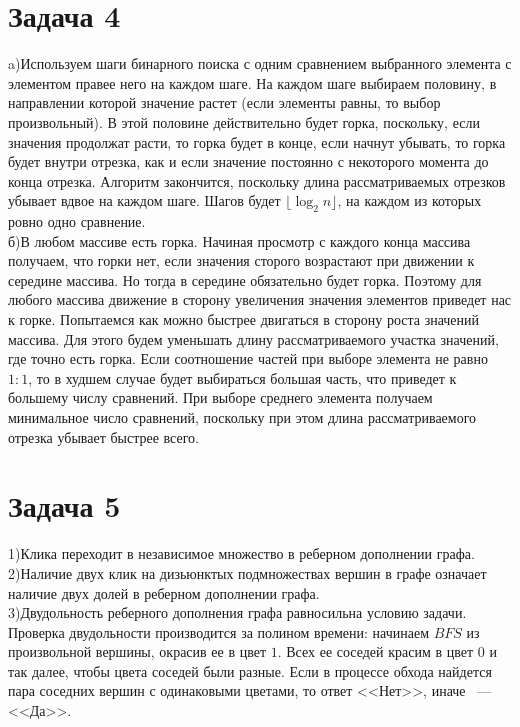 \documentclass[a4paper,12pt]{article} %
\begin{document}
\section*{Задача 4}
a)Используем шаги бинарного поиска с одним сравнением выбранного элемента с элементом правее него на каждом шаге. На каждом шаге выбираем половину, в направлении которой значение растет (если элементы равны, то выбор произвольный). В этой половине действительно будет горка, поскольку, если значения продолжат расти, то горка будет в конце, если начнут убывать, то горка будет внутри отрезка, как и если значение постоянно с некоторого момента до конца отрезка. Алгоритм закончится, поскольку длина рассматриваемых отрезков убывает вдвое на каждом шаге. Шагов будет $\lfloor\log_2{n}\rfloor$, на каждом из которых ровно одно сравнение.\\

б)В любом массиве есть горка. Начиная просмотр с каждого конца массива получаем, что горки нет, если значения сторого возрастают при движении к середине массива. Но тогда в середине обязательно будет горка. Поэтому для любого массива движение в сторону увеличения значения элементов приведет нас к горке. Попытаемся как можно быстрее двигаться в сторону роста значений массива. Для этого будем уменьшать длину рассматриваемого участка значений, где точно есть горка. Если соотношение частей при выборе элемента не равно  $1:1$, то в худшем случае будет выбираться большая часть, что приведет к большему числу сравнений. При выборе среднего элемента получаем минимальное число сравнений, поскольку при этом длина рассматриваемого отрезка убывает быстрее всего.\\


\section*{Задача 5}
 1)Клика переходит в независимое множество в реберном дополнении графа.\\
 
 2)Наличие двух клик на дизьюнктых подмножествах вершин в графе означает наличие двух долей в реберном дополнении графа.\\
 
 3)Двудольность реберного дополнения графа равносильна условию задачи.\\
  Проверка двудольности производится за полином времени: начинаем $BFS$ из произвольной вершины, окрасив ее в цвет $1$. Всех ее соседей красим в цвет $0$ и так далее, чтобы цвета соседей были разные. Если в процессе обхода найдется пара соседних вершин с одинаковыми цветами, то ответ <<Нет>>, иначе ~---~ <<Да>>.\\
\end{document}
